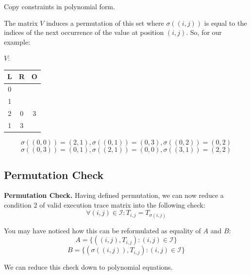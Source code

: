 \documentclass{zkdl-presentation-template}
\begin{document}
    \begin{frame} {Copy constraints in polynomial form.}
        \begin{example}
            The matrix $V$ induces a permutation of this set where $\sigma((i,j))$ is equal to the indices of the next occurrence of the value at position $(i,j)$. So, for our example:
            
            \begin{center}
                \quad $V$:
                \begin{tabular}{|c|c|c|}
                    \hline
                    L & R & O \\
                    \hline
                    0 &  &  \\
                    \hline
                    1 &  &  \\
                    \hline
                    2 & 0 & 3 \\
                    \hline
                    1 & 3 &  \\
                    \hline
                \end{tabular}
            \end{center}

            \[\sigma((0,0)) = (2,1), \sigma((0,1)) = (0,3), \sigma((0,2)) = (0,2)\]
            \[\sigma((0,3)) = (0,1), \sigma((2,1)) = (0,0), \sigma((3,1)) = (2,2)\]

        \end{example}
    \end{frame}

    \subsection{Permutation Check}
    \begin{frame}
        \textcolor{blue!80!black}{\textbf{Permutation Check.}} Having defined permutation, we can now reduce a condition $2$ of valid execution trace matrix into the following check:
        \[\forall (i, j) \in \mathcal{I}: T_{i,j} = T_{\sigma(i,j)}\]
        
        You may have noticed how this can be reformulated as equality of $A$ and $B$:
        \[A = \{((i, j), T_{i,j}) : (i, j) \in \mathcal{I}\}\]
        \[B = \{(\sigma((i, j)), T_{i,j}) : (i, j) \in \mathcal{I}\}\]
        
        We can reduce this check down to polynomial equations.        
    \end{frame}
\end{document}
